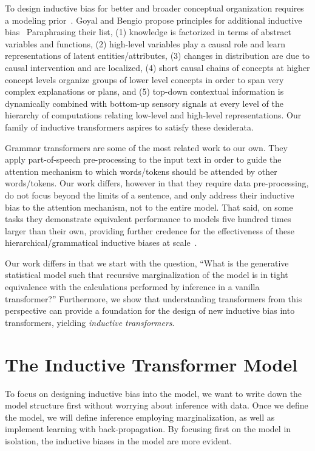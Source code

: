 \documentclass{article}
\begin{document}
To design inductive bias for better and broader conceptual organization requires a modeling prior~\citep{frankle2019lottery}.  Goyal and Bengio propose principles for additional inductive bias~\citep{goyal2022inductive} Paraphrasing their list, (1) knowledge is factorized in terms of abstract variables and functions, (2) high-level variables play a causal role and learn representations of latent entities/attributes, (3) changes in distribution are due to causal intervention and are localized, (4) short causal chains of concepts at higher concept levels organize groups of lower level concepts in order to span very complex explanations or plans, and (5) top-down contextual information is dynamically combined with bottom-up sensory signals at every level of the hierarchy of computations relating low-level and high-level representations.  Our family of inductive transformers aspires to satisfy these desiderata.

Grammar transformers are some of the most related work to our own. They apply part-of-speech pre-processing to the input text in order to guide the attention mechanism to which words/tokens should be attended by other words/tokens.  Our work differs, however in that they require data pre-processing, do not focus beyond the limits of a sentence, and only address their inductive bias to the attention mechanism, not to the entire model.  That said, on some tasks they demonstrate equivalent performance to models five hundred times larger than their own, providing further credence for the effectiveness of these hierarchical/grammatical inductive biases at scale~\citep{sartran2022transformer}.

Our work differs in that we start with the question, ``What is the generative statistical model such that recursive marginalization of the model is in tight equivalence with the calculations performed by inference in a vanilla transformer?''  Furthermore, we show that understanding transformers from this perspective can provide a foundation for the design of new inductive bias into transformers, yielding \emph{inductive transformers}.

\section{The Inductive Transformer Model}\label{section:inductive-transformer-model}

To focus on designing inductive bias into the model, we want to write down the model structure first without worrying about inference with data.  Once we define the model, we will define inference employing marginalization, as well as implement learning with back-propagation.  By focusing first on the model in isolation, the inductive biases in the model are more evident.
\end{document}
